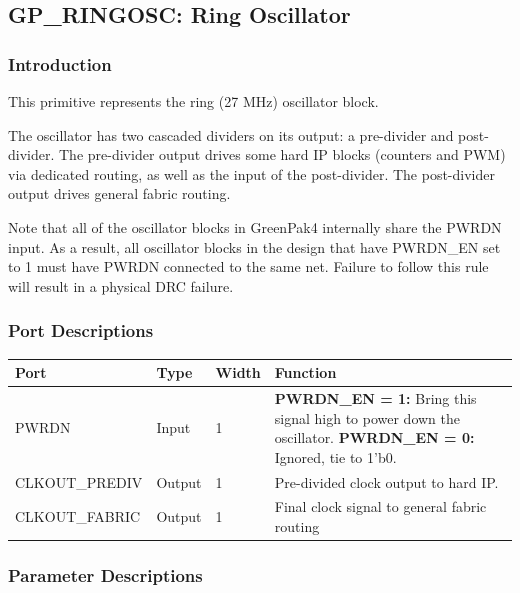 \documentclass{article}
\begin{document}
\pagebreak
\subsection{GP\_RINGOSC: Ring Oscillator}

\subsubsection{Introduction}
This primitive represents the ring (27 MHz) oscillator block.

The oscillator has two cascaded dividers on its output: a pre-divider and post-divider. The pre-divider output drives 
some hard IP blocks (counters and PWM) via dedicated routing, as well as the input of the post-divider. The 
post-divider output drives general fabric routing.

Note that all of the oscillator blocks in GreenPak4 internally share the PWRDN input. As a result, all oscillator 
blocks in the design that have PWRDN\_EN set to 1 must have PWRDN connected to the same net. Failure to follow this 
rule will result in a physical DRC failure.

\subsubsection{Port Descriptions}

\begin{tabularx}{5in}{|l|l|l|X|}
\hline
{\bfseries Port} & {\bfseries Type} & {\bfseries Width} & {\bfseries Function} \\
\hline
PWRDN & Input & 1 &
	{\bfseries PWRDN\_EN = 1:} \newline Bring this signal high to power down the oscillator. \newline
	{\bfseries PWRDN\_EN = 0:} \newline Ignored, tie to 1'b0.\\
\hline
CLKOUT\_PREDIV & Output & 1 & Pre-divided clock output to hard IP.  \\
\hline
CLKOUT\_FABRIC & Output & 1 & Final clock signal to general fabric routing\\
\hline
\end{tabularx}

\subsubsection{Parameter Descriptions}
\end{document}
